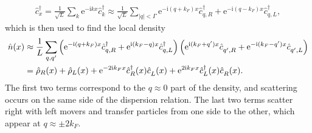 \documentclass{svmono}
\def\ri{\mathrm i}
\def\re{\mathrm e}
\def\pdag{{\vphantom\dag}}
\newcommand{\brlr}[1]{\left( #1 \right)}
\providecommand{\DIFaddbegin}{} %
\providecommand{\DIFaddend}{} %
\providecommand{\DIFdelbegin}{} %
\providecommand{\DIFdelend}{} %
\newcommand{\DIFscaledelfig}{0.5}
\newlength{\DIFdelgraphicswidth} %
\newlength{\DIFdelgraphicsheight} %
\newcommand{\DIFaddincludegraphics}[2][]{{\color{blue}\fbox{\DIFOincludegraphics[#1]{#2}}}} %
\newcommand{\DIFdelincludegraphics}[2][]{%
\sbox{\DIFdelgraphicsbox}{\DIFOincludegraphics[#1]{#2}}%
\settoboxwidth{\DIFdelgraphicswidth}{\DIFdelgraphicsbox} %
\settoboxtotalheight{\DIFdelgraphicsheight}{\DIFdelgraphicsbox} %
\scalebox{\DIFscaledelfig}{%
\parbox[b]{\DIFdelgraphicswidth}{\usebox{\DIFdelgraphicsbox}\\[-\baselineskip] \rule{\DIFdelgraphicswidth}{0em}}\llap{\resizebox{\DIFdelgraphicswidth}{\DIFdelgraphicsheight}{%
\setlength{\unitlength}{\DIFdelgraphicswidth}%
\begin{picture}(1,1)%
\thicklines\linethickness{2pt} %
{\color[rgb]{1,0,0}\put(0,0){\framebox(1,1){}}}%
{\color[rgb]{1,0,0}\put(0,0){\line( 1,1){1}}}%
{\color[rgb]{1,0,0}\put(0,1){\line(1,-1){1}}}%
\end{picture}%
}\hspace*{3pt}}} %
} %
\DeclareRobustCommand{\DIFaddbegin}{\DIFOaddbegin \let\includegraphics\DIFaddincludegraphics} %
\DeclareRobustCommand{\DIFaddend}{\DIFOaddend \let\includegraphics\DIFOincludegraphics} %
\DeclareRobustCommand{\DIFdelbegin}{\DIFOdelbegin \let\includegraphics\DIFdelincludegraphics} %
\DeclareRobustCommand{\DIFdelend}{\DIFOaddend \let\includegraphics\DIFOincludegraphics} %
\begin{document}
\DIFdelend \DIFaddbegin \begin{align}
    \hat c^\dag_x = \frac1{\sqrt L}\sum_k \re^{-\ri k x}\hat c^\dag_k \approx \frac1{\sqrt L}\sum_{|q|<\Gamma}\re^{-\ri (q+k_F) x}\hat c^\dag_{q,R} + \re^{-\ri (q-k_F) x}\hat c^\dag_{q,L},
    \label{eq:confinement_creation_annihilation}
\end{align}\DIFaddend 
which is then used to find the local density
\DIFdelbegin %
\DIFdelend \DIFaddbegin \begin{align}
    \hat n(x)
    &\approx \frac1L\sum_{q,q'}\brlr{\re^{-\ri (q+k_F) x}\hat c^\dag_{q,R} + \re^{\ri (k_F-q) x}\hat c^\dag_{q,L}}\brlr{\re^{\ri (k_F+q') x}\hat c^\pdag_{q',R} + \re^{-\ri (k_F-q') x}\hat c^\pdag_{q',L}}
    \\
    &= \hat \rho_R(x) + \hat \rho_L(x) + \re^{-2\ri k_Fx}\hat c^\dag_{R}(x)\hat c^\pdag_{L}(x) + \re^{2\ri k_Fx}\hat c^\dag_{L}(x)\hat c^\pdag_{R}(x).
    \label{eq:local_density_approximation}
\end{align}\DIFaddend 
The first two terms correspond to the $q\approx0$ part of the density, and scattering occurs on the same side of the dispersion relation.
The last two terms scatter right with left movers and transfer particles from one side to the other, which appear at $q\approx\pm2k_F$.
\end{document}
